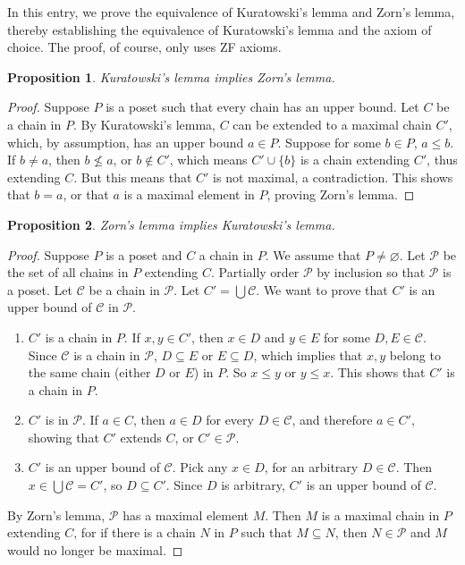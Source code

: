 \documentclass[12pt]{article}
\newtheorem{prop}{Proposition}
\begin{document}
In this entry, we prove the equivalence of Kuratowski's lemma and Zorn's lemma, thereby establishing the equivalence of Kuratowski's lemma and the axiom of choice.  The proof, of course, only uses ZF axioms.

\begin{prop} Kuratowski's lemma implies Zorn's lemma. \end{prop}
\begin{proof}
Suppose $P$ is a poset such that every chain has an upper bound.  Let $C$ be a chain in $P$.  By Kuratowski's lemma, $C$ can be extended to a maximal chain $C'$, which, by assumption, has an upper bound $a\in P$.  Suppose for some $b\in P$, $a\le b$.  If $b\ne a$, then $b\not\le a$, or $b\notin C'$, which means $C'\cup \lbrace b\rbrace$ is a chain extending $C'$, thus extending $C$.  But this means that $C'$ is not maximal, a contradiction.  This shows that $b=a$, or that $a$ is a maximal element in $P$, proving Zorn's lemma.
\end{proof}

\begin{prop} Zorn's lemma implies Kuratowski's lemma. \end{prop}
\begin{proof}
Suppose $P$ is a poset and $C$ a chain in $P$.  We assume that $P\ne \varnothing$.  Let $\mathcal{P}$ be the set of all chains in $P$ extending $C$.  Partially order $\mathcal{P}$ by inclusion so that $\mathcal{P}$ is a poset.  Let $\mathcal{C}$ be a chain in $\mathcal{P}$.  Let $C'=\bigcup \mathcal{C}$.  We want to prove that $C'$ is an upper bound of $\mathcal{C}$ in $\mathcal{P}$.  
\begin{enumerate}
\item $C'$ is a chain in $P$.  If $x,y\in C'$, then $x\in D$ and $y\in E$ for some $D,E\in \mathcal{C}$.  Since $\mathcal{C}$ is a chain in $\mathcal{P}$, $D\subseteq E$ or $E\subseteq D$, which implies that $x,y$ belong to the same chain (either $D$ or $E$) in $P$.  So $x\le y$ or $y\le x$.  This shows that $C'$ is a chain in $P$.  
\item $C'$ is in $\mathcal{P}$.  If $a\in C$, then $a\in D$ for every $D\in \mathcal{C}$, and therefore $a\in C'$, showing that $C'$ extends $C$, or $C' \in \mathcal{P}$.  
\item $C'$ is an upper bound of $\mathcal{C}$.  Pick any $x\in D$, for an arbitrary $D\in \mathcal{C}$.  Then $x\in \bigcup \mathcal{C}=C'$, so $D\subseteq C'$.  Since $D$ is arbitrary, $C'$ is an upper bound of $\mathcal{C}$.
\end{enumerate}
By Zorn's lemma, $\mathcal{P}$ has a maximal element $M$.  Then $M$ is a maximal chain in $P$ extending $C$, for if there is a chain $N$ in $P$ such that $M\subseteq N$, then $N\in \mathcal{P}$ and $M$ would no longer be maximal.
\end{proof}
\end{document}
